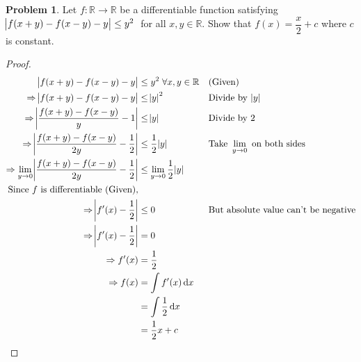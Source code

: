 \documentclass[14]{article}
\theoremstyle{definition}
\newtheorem{prob}{Problem}
\theoremstyle{case}
\begin{document}
\begin{prob}
Let $f : \mathbb{R} \to \mathbb{R}$ be a differentiable function satisfying $\abs{f(x+y) - f(x-y) - y} \leq y^2 \; $ for all $x, y \in \mathbb{R}$. Show that $f(x) = \dfrac x2 + c$ where $c$ is constant.
\begin{proof}
\begin{align*}
\abs{f(x+y) - f(x-y) - y} &\leq y^2 \; \forall x, y \in \mathbb{R} && \text{(Given)}\\
\Rightarrow \abs{f(x+y) - f(x-y) - y} &\leq \abs{y}^2 && \text{Divide by } \abs{y}\\
\Rightarrow \abs{\dfrac{f(x+y) - f(x-y)}{y} - 1} &\leq \abs{y} && \text{Divide by } 2\\
\Rightarrow \abs{\dfrac{f(x+y) - f(x-y)}{2y} - \dfrac12} &\leq \dfrac12 \abs{y} &&  \text{Take } \lim\limits_{y\to 0} \text{ on both sides}\\
\Rightarrow \lim\limits_{y\to 0} \abs{\dfrac{f(x+y) - f(x-y)}{2y} - \dfrac12} &\leq \lim\limits_{y\to 0} \dfrac12 \abs{y}\\
\text{Since } f \text{ is differentiable (Given),}\\
\Rightarrow \abs{f'(x) - \dfrac12} &\leq 0 && \text{But absolute value can't be negative}\\
\Rightarrow \abs{f'(x) - \dfrac12} &= 0\\
\Rightarrow f'(x) &= \dfrac12\\
\Rightarrow f(x) &= \int f'(x) \dif x\\
&= \int \dfrac12 \dif x\\
&= \dfrac12 x + c
\end{align*}
\end{proof}
\end{prob}
\pagebreak
\end{document}
